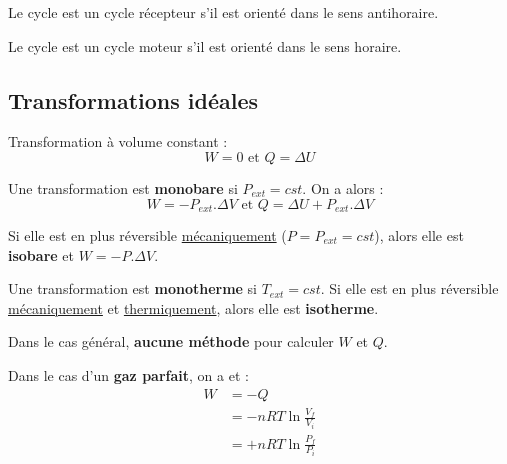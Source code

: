 \documentclass[11pt]{article}
\theoremstyle{cstyle}{\newtheorem{definition}{Définition}[section]}
\theoremstyle{cstyle}{\newtheorem{proposition}[definition]{Propriété}}
\theoremstyle{cstyle}{\newtheorem{theorem}[definition]{Théorème}}
\theoremstyle{mystyle}{\newtheorem{lemma}[definition]{Lemme}}
\theoremstyle{mystyle}{\newtheorem{corollary}[definition]{Corollaire}}
\theoremstyle{mystyle}{\newtheorem*{remark}{Remarque}}
\theoremstyle{mystyle}{\newtheorem*{remarks}{Remarques}}
\theoremstyle{mystyle}{\newtheorem*{example}{Exemple}}
\theoremstyle{mystyle}{\newtheorem*{examples}{Exemples}}
\theoremstyle{definition}{\newtheorem*{exercise}{Exercice}}
\theoremstyle{mystyle}{\newtheorem*{methode}{Méthode}}
\theoremstyle{cstyle}{\newtheorem*{cthm}{}}
\theoremstyle{warn}
\begin{document}
	\newpage
	\begin{minipage}[t]{0.45\textwidth}
		\begin{definition}
			Le cycle est un cycle récepteur s'il est orienté dans le sens antihoraire.
			
			Le cycle est un cycle moteur s'il est orienté dans le sens horaire.
		\end{definition}
		
		\subsection{Transformations idéales}
		
		\begin{definition}[Isochore]
			Transformation à volume constant : 
			\[
			W = 0 \text{ et } Q = \Delta U
			\]
		\end{definition}
		
		\begin{definition}
			Une transformation est \textbf{monobare} si \(P_{ext} = cst\). On a alors :
			\[W = -P_{ext}.\Delta V \text{ et } Q = \Delta U + P_{ext}.\Delta V\]
			
			Si elle est en plus réversible \underline{mécaniquement} (\(P = P_{ext} = cst\)), alors elle est \textbf{isobare} et \(W = -P.\Delta V\).
			
			
		\end{definition}
		
		\begin{definition}
			Une transformation est \textbf{monotherme} si \(T_{ext} = cst\).
			Si elle est en plus réversible \underline{mécaniquement} et \underline{thermiquement}, alors elle est \textbf{isotherme}.
			
			Dans le cas général, \textbf{aucune méthode} pour calculer \(W\) et \(Q\).
			
			Dans le cas d'un \textbf{gaz parfait}, on a  et :
			\begin{align*}
				W &= -Q\\
				&= -nRT \ln\frac{V_f}{V_i}\\
				&= +nRT \ln\frac{P_f}{P_i}
			\end{align*}
		\end{definition}		
	\end{minipage}
	\hfill
	\vrule
	\hfill
\end{document}
